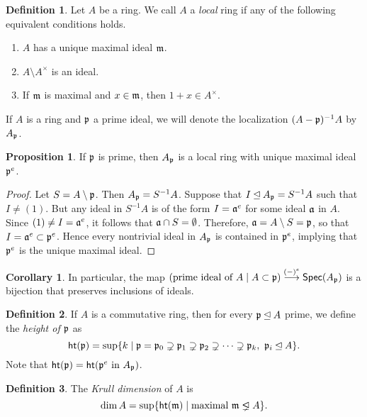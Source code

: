 \documentclass[10pt,letterpaper,cm]{nupset}
\theoremstyle{definition}
\newtheorem*{definition}{Definition}
\newtheorem{prop}{Proposition}
\newtheorem{corollary}{Corollary}
\newcommand{\1}{\mathbf{1}}
\newcommand{\p}{\frak{p}}
\newcommand{\0}{\vec 0}
\newcommand{\properideal}{%
  \mathrel{\ooalign{$\lneq$\cr\raise.22ex\hbox{$\lhd$}\cr}}}
\begin{document}
\begin{definition}
Let $A$ be a ring. We call $A$ a \textit{local} ring if any of the following equivalent conditions holds.
\begin{enumerate}[label=(\alph*)]
\item $A$ has a unique maximal ideal $\frak{m}$.
\item $A \setminus A^{\times}$ is an ideal.
\item If $\frak{m}$ is maximal and $x\in \frak{m}$, then $1+x \in A^{\times}$. 
\end{enumerate}
If $A$ is a ring and $\p$ a prime ideal, we will denote the localization $(A- \p)^{-1}A $ by $A_{\p}$. 
\end{definition}

\begin{prop}
 If $\p$ is prime, then $A_{\p}$ is a local ring with unique maximal ideal $\p^e$.
\end{prop}
\begin{proof}
Let $S = A \setminus \p$. Then $A_{\p} = S^{-1}A$. Suppose that $I \unlhd A_{\p} = S^{-1}A$  such that $I \ne (1)$. But any ideal in $S^{-1}A$ is of the form $I = \frak{a}^e$ for some ideal $\frak{a}$ in $A$. Since $(1) \ne I = \frak{a}^e$, it follows that $\frak{a} \cap S = \emptyset$. Therefore, $\frak{a} = A \setminus S = \p$, so that $I= \frak{a}^e \subset \p^e$. Hence every nontrivial ideal in $A_{\p}$ is contained in $\p^e$, implying that $\p^e$ is the unique maximal ideal. 
\end{proof}

\begin{corollary}
In particular, the map $(\text{prime ideal of } A \mid A \subset \p) \overset{(-)^e}{\longrightarrow} \mathsf{Spec}(A_{\p})$ is a bijection that preserves inclusions of ideals. 
\end{corollary}

\begin{definition}
If $A$ is a commutative ring, then for every $\p \unlhd A$ prime, we define the \textit{height of $\p$} as $$\mathsf{ht}(\p) = \sup\{ k \mid \p = \p_0 \supsetneq \p_1 \supsetneq \p_2 \supsetneq \cdots \supsetneq \p_k, \  \p_i \unlhd A   \}. $$ Note that $\mathsf{ht}(\p) = \mathsf{ht}(\p^e \text{ in } A_{\p})$.
\end{definition}

\begin{definition}
The \textit{Krull dimension} of $A$ is $$ \dim{A} = \sup \{  \mathsf{ht}(\frak{m}) \mid \text{maximal } \frak{m} \properideal A \}  .$$
\end{definition}
\end{document}
